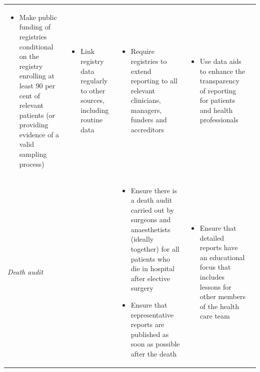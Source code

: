 \documentclass[FrontPage]{grattan}
\begin{document}
\begin{longtable}{@{}>{\itshape}p{1.2cm}p{5.4cm}p{5.6cm}p{5.35cm}p{5.4cm}}
\begin{itemize}[noitemsep,topsep=0pt,leftmargin=*]
        \item Make public funding of registries conditional on the registry enrolling at least 90 per cent of relevant patients (or providing evidence of a valid sampling process)
    \end{itemize} & \vspace{-2.5ex}\begin{itemize}[noitemsep,topsep=0pt,leftmargin=*]
        \item Link registry data regularly to other sources, including routine data
    \end{itemize}  & \vspace{-2.5ex}\begin{itemize}[noitemsep,topsep=0pt,leftmargin=*]
        \item Require registries to extend reporting to all relevant clinicians, managers, funders and accreditors
    \end{itemize} & \vspace{-2.5ex}\begin{itemize}[noitemsep,topsep=0pt,leftmargin=*]
        \item Use data aids to enhance the transparency of reporting for patients and health professionals
    \end{itemize}  \\ 
%    
    Death audit &  & \vspace{-2.5ex}\begin{itemize}[noitemsep,topsep=0pt,leftmargin=*]
        \item Ensure there is a death audit carried out by surgeons and anaesthetists (ideally together) for all patients who die in hospital after elective surgery
        \item Ensure that representative reports are published as soon as possible after the death
    \end{itemize}  & \vspace{-2.5ex}\begin{itemize}[noitemsep,topsep=0pt,leftmargin=*]
    \item Ensure that detailed reports have an educational focus that includes lessons for other members of the health care team
    \end{itemize} & \\
    

\end{longtable}
\end{document}
